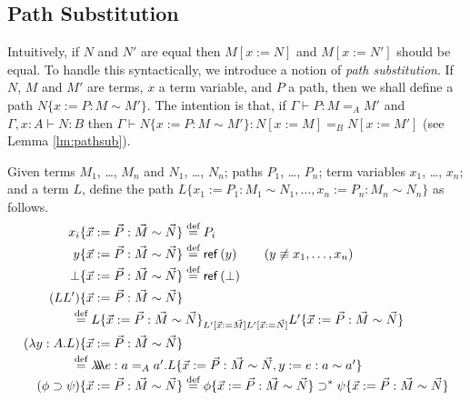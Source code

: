 
\subsection{Path Substitution}

Intuitively, if $N$ and $N'$ are equal then $M[x:=N]$ and $M[x:=N']$ should be equal.  To handle this syntactically,
we introduce a notion of \emph{path substitution}.  If $N$, $M$ and $M'$ are terms, $x$ a term variable, and $P$ a path, then we shall define a path $N \{ x := P : M \sim M' \}$.  The intention is that, if
$\Gamma \vdash P : M =_A M'$ and $\Gamma, x : A \vdash N : B$ then $\Gamma \vdash N \{ x := P : M \sim M' \} : N [ x:= M ] =_B N [ x := M' ]$ (see Lemma \ref{lm:pathsub}). 

\begin{definition}
Given terms $M_1$, \ldots, $M_n$ and $N_1$, \ldots, $N_n$; paths $P_1$, \ldots, $P_n$; term variables $x_1$, \ldots, $x_n$; and a term $L$, define the path $L \{ x_1 := P_1 : M_1 \sim N_1 , \ldots, x_n := P_n : M_n \sim N_n \}$ as follows.
\begin{align*}
x_i \{ \vec{x} := \vec{P} : \vec{M} \sim \vec{N} \} & \eqdef P_i \\
y \{ \vec{x} := \vec{P} : \vec{M} \sim \vec{N} \} & \eqdef \reff{y} \qquad (y \not\equiv x_1, \ldots, x_n) \\
\bot \{ \vec{x} := \vec{P} : \vec{M} \sim \vec{N} \} & \eqdef \reff{\bot} \\
(LL') \{ \vec{x} := \vec{P} : \vec{M} \sim \vec{N} \} \\
\omit\rlap{\qquad \qquad $\eqdef L \{ \vec{x} := \vec{P} : \vec{M} \sim \vec{N} \}_{L' [\vec{x} := \vec{M}] L' [\vec{x} := \vec{N}]} L' \{ \vec{x} := \vec{P} : \vec{M} \sim \vec{N} \}$} \\
(\lambda y:A.L) \{ \vec{x} := \vec{P} : \vec{M} \sim \vec{N} \} & \\
\omit\rlap{\qquad\qquad $\eqdef \triplelambda e : a =_A a' . L \{ \vec{x} := \vec{P} : \vec{M} \sim \vec{N} , y := e : a \sim a' \}$} \\
(\phi \supset \psi) \{ \vec{x} := \vec{P} : \vec{M} \sim \vec{N} \} & \eqdef \phi \{ \vec{x} := \vec{P} : \vec{M} \sim \vec{N} \} \supset^* \psi \{ \vec{x} := \vec{P} : \vec{M} \sim \vec{N} \}
\end{align*}
\end{definition}

